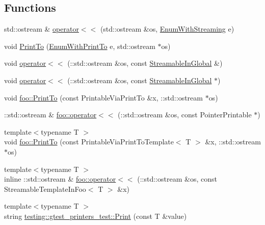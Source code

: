 \subsection*{Functions}
\begin{DoxyCompactItemize}
\item 
std\+::ostream \& \hyperlink{gtest-printers__test_8cc_ab3395b6b04bac565a0bd2fb36fbbb339}{operator$<$$<$} (std\+::ostream \&os, \hyperlink{gtest-printers__test_8cc_a52d9f846ca7a081ba3acf88dd6cd46dc}{Enum\+With\+Streaming} e)
\item 
void \hyperlink{gtest-printers__test_8cc_aad8245a4b48cd65607b86153d0f9dbe6}{Print\+To} (\hyperlink{gtest-printers__test_8cc_a904d619d593201ed509be794aed041ec}{Enum\+With\+Print\+To} e, std\+::ostream $\ast$os)
\item 
void \hyperlink{gtest-printers__test_8cc_a7b9d893679e433b9a70f15a9c9d6446c}{operator$<$$<$} (\+::std\+::ostream \&os, const \hyperlink{class_streamable_in_global}{Streamable\+In\+Global} \&)
\item 
void \hyperlink{gtest-printers__test_8cc_a0794c66a458fe922bfb717080d047311}{operator$<$$<$} (\+::std\+::ostream \&os, const \hyperlink{class_streamable_in_global}{Streamable\+In\+Global} $\ast$)
\item 
void \hyperlink{namespacefoo_ac435de653934c97045bbdba8c8afbe3f}{foo\+::\+Print\+To} (const Printable\+Via\+Print\+To \&x, \+::std\+::ostream $\ast$os)
\item 
\+::std\+::ostream \& \hyperlink{namespacefoo_a65f8809f6af7f69f5cc842493caf4491}{foo\+::operator$<$$<$} (\+::std\+::ostream \&os, const Pointer\+Printable $\ast$)
\item 
{\footnotesize template$<$typename T $>$ }\\void \hyperlink{namespacefoo_a7b78eba501ea7ff1226a8cb40b6e3d92}{foo\+::\+Print\+To} (const Printable\+Via\+Print\+To\+Template$<$ T $>$ \&x, \+::std\+::ostream $\ast$os)
\item 
{\footnotesize template$<$typename T $>$ }\\inline \+::std\+::ostream \& \hyperlink{namespacefoo_abe04f604d114085b0b9af25600ef00da}{foo\+::operator$<$$<$} (\+::std\+::ostream \&os, const Streamable\+Template\+In\+Foo$<$ T $>$ \&x)
\item 
{\footnotesize template$<$typename T $>$ }\\string \hyperlink{namespacetesting_1_1gtest__printers__test_adab26e59d2d7781c06a2c1c5948a8f65}{testing\+::gtest\+\_\+printers\+\_\+test\+::\+Print} (const T \&value)
\item 

\end{DoxyCompactItemize}
